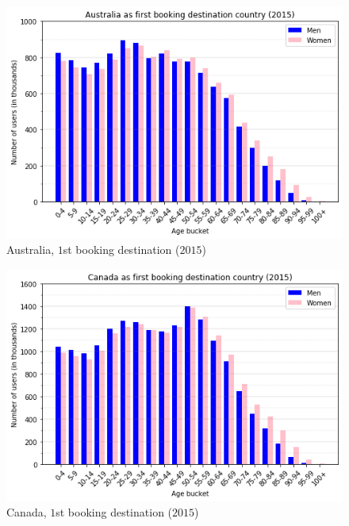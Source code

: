 \documentclass[twocolumn, switch]{article}
\begin{document}
\begin{figure}[H]
\centering
\includegraphics[scale=0.35]{../graphs/age_gender_bkts_AU}
\caption{Australia, $1$st booking destination ($2015$)}
\label{fig:australia}
\end{figure}

\begin{figure}[H]
\centering
\includegraphics[scale=0.35]{../graphs/age_gender_bkts_CA}
\caption{Canada, $1$st booking destination ($2015$)}
\label{fig:canada}
\end{figure}
\end{document}
